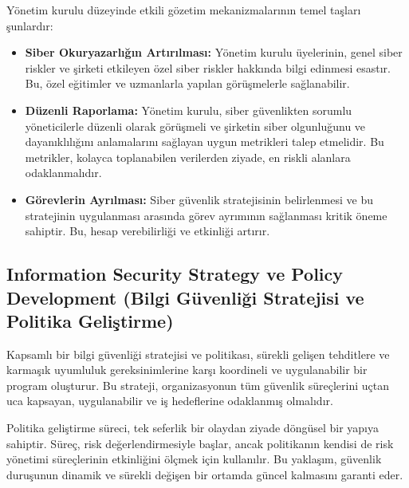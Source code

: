 Yönetim kurulu düzeyinde etkili gözetim mekanizmalarının temel taşları şunlardır:
\begin{itemize}
    \item \textbf{Siber Okuryazarlığın Artırılması:} Yönetim kurulu üyelerinin, genel siber riskler ve şirketi etkileyen özel siber riskler hakkında bilgi edinmesi esastır. Bu, özel eğitimler ve uzmanlarla yapılan görüşmelerle sağlanabilir.
    \item \textbf{Düzenli Raporlama:} Yönetim kurulu, siber güvenlikten sorumlu yöneticilerle düzenli olarak görüşmeli ve şirketin siber olgunluğunu ve dayanıklılığını anlamalarını sağlayan uygun metrikleri talep etmelidir. Bu metrikler, kolayca toplanabilen verilerden ziyade, en riskli alanlara odaklanmalıdır.
    \item \textbf{Görevlerin Ayrılması:} Siber güvenlik stratejisinin belirlenmesi ve bu stratejinin uygulanması arasında görev ayrımının sağlanması kritik öneme sahiptir. Bu, hesap verebilirliği ve etkinliği artırır.
\end{itemize}

\subsection{Information Security Strategy ve Policy Development (Bilgi Güvenliği Stratejisi ve Politika Geliştirme)}

Kapsamlı bir bilgi güvenliği stratejisi ve politikası, sürekli gelişen tehditlere ve karmaşık uyumluluk gereksinimlerine karşı koordineli ve uygulanabilir bir program oluşturur. Bu strateji, organizasyonun tüm güvenlik süreçlerini uçtan uca kapsayan, uygulanabilir ve iş hedeflerine odaklanmış olmalıdır.

Politika geliştirme süreci, tek seferlik bir olaydan ziyade döngüsel bir yapıya sahiptir. Süreç, risk değerlendirmesiyle başlar, ancak politikanın kendisi de risk yönetimi süreçlerinin etkinliğini ölçmek için kullanılır. Bu yaklaşım, güvenlik duruşunun dinamik ve sürekli değişen bir ortamda güncel kalmasını garanti eder.

